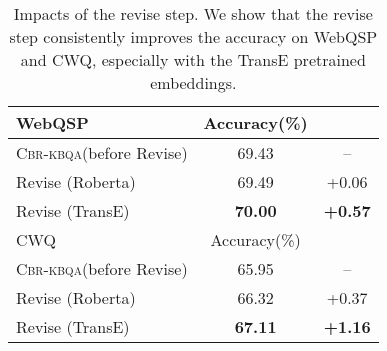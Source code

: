 \documentclass[11pt]{article}
\newcommand{\alg}{\textsc{Cbr-kbqa}\xspace}
\begin{document}
\begin{table}[t]
    \centering
    \small
    \begin{tabular}{@{}l c c@{}}
    \toprule
        WebQSP &  Accuracy(\%) & \\
        \midrule
        \alg (before Revise) & 69.43 & --\\
        Revise (Roberta) & 69.49 & +0.06\\
        Revise (TransE) & \textbf{70.00} & \textbf{+0.57}\\
        \midrule
        CWQ &  Accuracy(\%) & \\
        \midrule
        \alg (before Revise) & 65.95 & --\\
        Revise (Roberta) & 66.32 & +0.37 \\
        Revise (TransE) & \textbf{67.11} & \textbf{+1.16}\\
    \bottomrule
    \end{tabular}
    \caption{Impacts of the revise step. We show that the revise step consistently improves the accuracy on WebQSP and CWQ, especially with the TransE pretrained embeddings.}
    \label{tab:revise}
    \vspace{-6mm}
\end{table}
\end{document}
